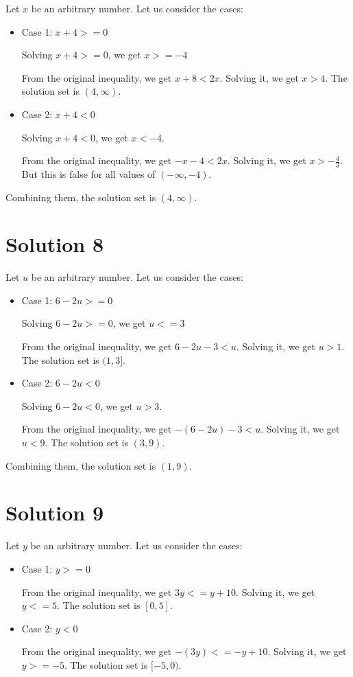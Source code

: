\documentclass{article}
\begin{document}
Let $x$ be an arbitrary number. Let us consider the cases:

\begin{itemize}
\item Case 1: $x + 4 >= 0$

  Solving $x + 4 >= 0$, we get $x >= -4$

  From the original inequality, we get $x + 8 < 2x$. Solving it, we
  get $x > 4$. The solution set is $(4, \infty)$.

\item Case 2: $x + 4 < 0$

  Solving $x + 4 < 0$, we get $x < -4$.

  From the original inequality, we get $-x - 4 < 2x$. Solving it, we
  get $x > -\frac{4}{3}$. But this is false for all values of
  $(-\infty, -4)$. 
\end{itemize}

Combining them, the solution set is $(4, \infty)$.

\section{Solution 8}

Let $u$ be an arbitrary number. Let us consider the cases:

\begin{itemize}
\item Case 1: $6 - 2u >= 0$

  Solving $6 - 2u >= 0$, we get $u <= 3$

  From the original inequality, we get $6 - 2u - 3 < u$. Solving it, we
  get $u > 1$. The solution set is $(1, 3]$.

\item Case 2: $6 - 2u < 0$

  Solving $6 - 2u < 0$, we get $u > 3$.

  From the original inequality, we get $-(6 - 2u) - 3 < u$. Solving it, we
  get $u < 9$. The solution set is $(3, 9)$.
\end{itemize}

Combining them, the solution set is $(1, 9)$.

\section{Solution 9}

Let $y$ be an arbitrary number. Let us consider the cases:

\begin{itemize}
\item Case 1: $y >= 0$

  From the original inequality, we get $3y <= y + 10$. Solving it, we
  get $y <= 5$. The solution set is $[0, 5]$.

\item Case 2: $y < 0$

  From the original inequality, we get $-(3y) <= -y + 10$. Solving it, we
  get $y >= -5$. The solution set is $[-5, 0)$.
\end{itemize}
\end{document}
